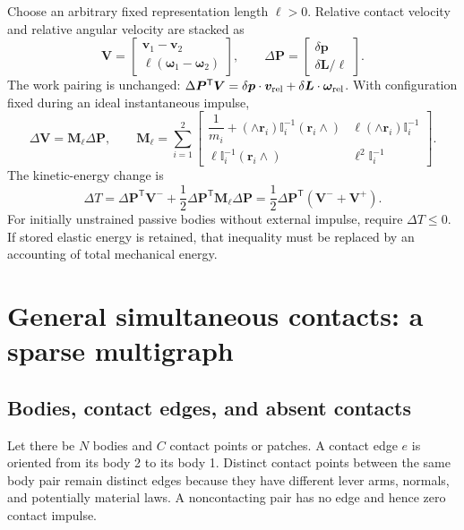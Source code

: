 \documentclass[11pt,a4paper]{article}
\newcommand{\bv}[1]{\bm{#1}}\newcommand{\inertia}{\mathbb I}
\newcommand{\rw}[1]{(\bv r_{#1}\wedge)}\newcommand{\lw}[1]{(\wedge\bv r_{#1})}
\begin{document}
Choose an arbitrary fixed representation length $\ell>0$. Relative contact velocity and relative angular velocity are stacked as
\begin{equation}
\bv V=\begin{bmatrix}\bv v_1-\bv v_2\\\ell(\bv\omega_1-\bv\omega_2)\end{bmatrix},
\qquad
\Delta\bv P=\begin{bmatrix}\delta\bv p\\\delta\bv L/\ell\end{bmatrix}.
\end{equation}
The work pairing is unchanged: $\Delta\bv P^{\mathsf T}\bv V=\delta\bv p\cdot\bv v_{\rm rel}+\delta\bv L\cdot\bv\omega_{\rm rel}$. With configuration fixed during an ideal instantaneous impulse,
\begin{equation}
\Delta\bv V=\bv M_\ell\Delta\bv P,\qquad
\bv M_\ell=\sum_{i=1}^2
\begin{bmatrix}
\dfrac1{m_i}+\lw i\inertia_i^{-1}\rw i&\ell\lw i\inertia_i^{-1}\\[6pt]
\ell\inertia_i^{-1}\rw i&\ell^2\inertia_i^{-1}
\end{bmatrix}.
\end{equation}
The kinetic-energy change is
\begin{equation}
\boxed{\Delta T=\Delta\bv P^{\mathsf T}\bv V^-
+\frac12\Delta\bv P^{\mathsf T}\bv M_\ell\Delta\bv P
=\frac12\Delta\bv P^{\mathsf T}(\bv V^-+\bv V^+).}
\end{equation}
For initially unstrained passive bodies without external impulse, require $\Delta T\leq0$. If stored elastic energy is retained, that inequality must be replaced by an accounting of total mechanical energy.

\section{General simultaneous contacts: a sparse multigraph}
\subsection{Bodies, contact edges, and absent contacts}
Let there be $N$ bodies and $C$ contact points or patches. A contact edge $e$ is oriented from its body 2 to its body 1. Distinct contact points between the same body pair remain distinct edges because they have different lever arms, normals, and potentially material laws. A noncontacting pair has no edge and hence zero contact impulse.
\end{document}
